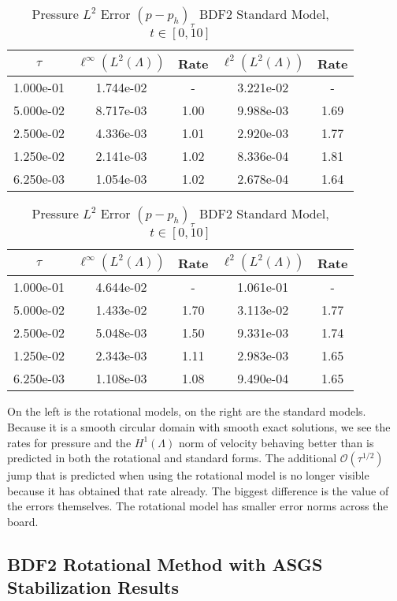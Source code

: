 \documentclass[letterpaper]{erdc}
\begin{document}
\begin{table}[h!]
  \parbox{.45\linewidth}{
  \tiny
  \centering
    \caption{Pressure $L^2$ Error $(p - p_h)_{\tau}$ BDF2 Rotational Model, $t\in[0,10]$}
    \begin{tabular}{c|c|c|c|c}
      $\tau$ &  $\ell^{\infty}\left(L^2(\Lambda)\right)$ &  Rate  &  $\ell^2\left(L^2(\Lambda)\right)$  &  Rate\\
      \hline
      1.000e-01 & 1.744e-02 &   -  & 3.221e-02 &   - \\
      5.000e-02 & 8.717e-03 & 1.00 & 9.988e-03 & 1.69\\
      2.500e-02 & 4.336e-03 & 1.01 & 2.920e-03 & 1.77\\
      1.250e-02 & 2.141e-03 & 1.02 & 8.336e-04 & 1.81\\
      6.250e-03 & 1.054e-03 & 1.02 & 2.678e-04 & 1.64
    \end{tabular}
    }
    \hfill
    \parbox{.45\linewidth}{
    \tiny
    \centering
      \caption{Pressure $L^2$ Error $(p - p_h)_{\tau}$ BDF2 Standard Model, $t\in[0,10]$}
      \begin{tabular}{c|c|c|c|c}
        $\tau$ &  $\ell^{\infty}\left(L^2(\Lambda)\right)$ &  Rate  &  $\ell^2\left(L^2(\Lambda)\right)$  &  Rate\\
        \hline
        1.000e-01 & 4.644e-02 &   -  & 1.061e-01 &   - \\
        5.000e-02 & 1.433e-02 & 1.70 & 3.113e-02 & 1.77\\
        2.500e-02 & 5.048e-03 & 1.50 & 9.331e-03 & 1.74\\
        1.250e-02 & 2.343e-03 & 1.11 & 2.983e-03 & 1.65\\
        6.250e-03 & 1.108e-03 & 1.08 & 9.490e-04 & 1.65
      \end{tabular}
    }
\end{table}


On the left is the rotational models,  on the right are the standard models.  Because it is a smooth circular domain with smooth exact solutions, we see the rates for pressure and the $H^1(\Lambda)$ norm of velocity behaving better than is predicted in both the rotational and standard forms.  The additional $\mathcal{O}(\tau^{1/2})$ jump that is predicted when using the rotational model is no longer visible because it has obtained that rate already.  The biggest difference is the value of the errors themselves.  The rotational model has smaller error norms across the board.


%
%
\subsection{BDF2 Rotational Method with ASGS Stabilization Results}
\end{document}

